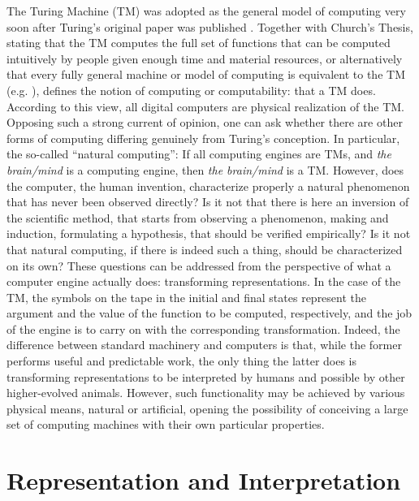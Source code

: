 \documentclass[11pt]{article}
\begin{document}
The Turing Machine (TM) was adopted as the general model of computing very soon after Turing's original paper was published \cite{turing-1936}. Together with Church's Thesis, stating that the TM computes the full set of functions that can be computed intuitively by people given enough time and material resources, or alternatively that every fully general machine or model of computing is equivalent to the TM (e.g. \cite{boolos-jeffrey-1989}), defines the notion of computing or computability: that a TM does. According to this view, all digital computers are physical realization of the TM. Opposing such a strong current of opinion, one can ask whether there are other forms of computing differing genuinely from Turing's conception. In particular, the so-called ``natural computing'': If all computing engines are TMs, and \emph{the brain/mind} is a computing engine, then \emph{the brain/mind} is a TM. However, does the computer, the human invention, characterize properly a natural phenomenon that has never been observed directly? Is it not that there is here an inversion of the scientific method, that starts from observing a phenomenon, making and induction, formulating a hypothesis, that should be verified empirically? Is it not that natural computing, if there is indeed such a thing, should be characterized on its own? These questions can be addressed from the perspective of what a computer engine actually does: transforming representations. In the case of the TM, the symbols on the tape in the initial and final states represent the argument and the value of the function to be computed, respectively, and the job of the engine is to carry on with the corresponding transformation. Indeed, the difference between standard machinery and computers is that, while the former performs useful and predictable work, the only thing the latter does is transforming representations to be interpreted by humans and possible by other higher-evolved animals. However, such functionality may be achieved by various physical means, natural or artificial, opening the possibility of conceiving a large set of computing machines with their own particular properties.

\section{Representation and Interpretation}
\label{sec:rep}
\end{document}
